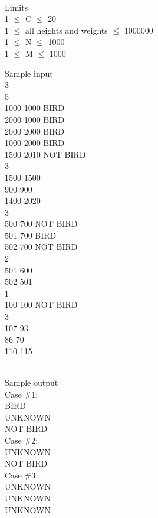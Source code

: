 \\   Limits   
\\   1  $\le$  C  $\le$  20   
\\   1  $\le$  all heights and weights  $\le$  1000000   
\\   1  $\le$  N  $\le$  1000   
\\   1  $\le$  M  $\le$  1000  

   Sample input   
\\   3   
\\   5   
\\   1000 1000 BIRD   
\\   2000 1000 BIRD   
\\   2000 2000 BIRD   
\\   1000 2000 BIRD   
\\   1500 2010 NOT BIRD   
\\   3   
\\   1500 1500   
\\   900 900   
\\   1400 2020   
\\   3   
\\   500 700 NOT BIRD   
\\   501 700 BIRD   
\\   502 700 NOT BIRD   
\\   2   
\\   501 600   
\\   502 501   
\\   1   
\\   100 100 NOT BIRD   
\\   3   
\\   107 93   
\\   86 70   
\\   110 115  


\\   Sample output   
\\   Case \#1:   
\\   BIRD   
\\   UNKNOWN   
\\   NOT BIRD   
\\   Case \#2:   
\\   UNKNOWN   
\\   NOT BIRD   
\\   Case \#3:   
\\   UNKNOWN   
\\   UNKNOWN   
\\   UNKNOWN  
